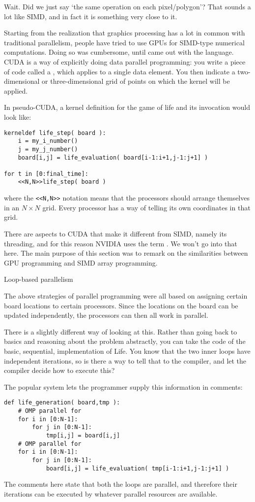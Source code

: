 Wait. Did we just say `the same operation on each pixel/polygon'? That sounds
a lot like \ac{SIMD}, and in fact it is something very close to it.

Starting from the realization that graphics processing has a lot
in common with traditional parallelism, people have tried to use \acp{GPU}
for \ac{SIMD}-type numerical computations. Doing so was cumbersome,
until  came out with the  language.
\ac{CUDA} is a way of explicitly doing data parallel programming:
you write a piece of code called a , which 
applies to a single data element. You then indicate a two-dimensional
or three-dimensional grid of points on which the kernel will be applied.

In pseudo-CUDA, a kernel definition for the game of life and its invocation
would look like:
\begin{verbatim}
kerneldef life_step( board ):
    i = my_i_number()
    j = my_j_number()
    board[i,j] = life_evaluation( board[i-1:i+1,j-1:j+1] )

for t in [0:final_time]:
    <<N,N>>life_step( board )
\end{verbatim}
where the \verb+<<N,N>>+ notation means that the processors should arrange
themselves in an $N\times N$ grid. Every processor has a way of telling
its own coordinates in that grid.

There are aspects to CUDA that make it different from SIMD, namely 
its threading, and for this reason NVIDIA uses the term
.  We won't go into that here. The main purpose of this
section was to remark on the similarities between GPU programming
and \ac{SIMD} array programming.

 {Loop-based parallelism}
\label{sec:omp}

The above strategies of parallel programming were all based on
assigning certain board locations to certain processors.
Since the locations on the board can be updated 
independently, the processors can then all work in parallel. 

There is a slightly different way of looking at this.
Rather than going back to basics and reasoning about 
the problem abstractly,
you can take the code of the basic, sequential, implementation of Life.
You know that the two inner loops have independent iterations,
so is there a way to tell that to the compiler, and let the compiler decide
how to execute this?

The popular  system lets the programmer
supply this information in comments:
\begin{verbatim}
def life_generation( board,tmp ):
    # OMP parallel for
    for i in [0:N-1]:
        for j in [0:N-1]:
            tmp[i,j] = board[i,j]
    # OMP parallel for
    for i in [0:N-1]:
        for j in [0:N-1]:
            board[i,j] = life_evaluation( tmp[i-1:i+1,j-1:j+1] )
\end{verbatim}
The comments here state that both
the  loops are parallel, and
therefore their iterations can be executed by whatever parallel resources are
available.

